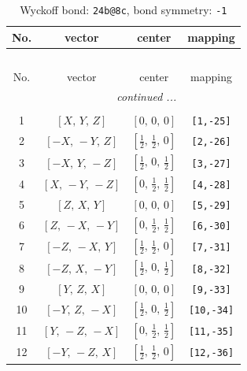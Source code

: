 \documentclass[fleqn,8pt]{jsarticle}
\begin{document}
\begin{longtable}{cccc}
\caption{Wyckoff bond: {\tt 24b@8c}, bond symmetry: {\tt -1}}
 \\
 \hline \hline
No. & vector & center & mapping \\ \hline \endfirsthead

\multicolumn{3}{l}{\tablename\ \thetable{}} \\
 \hline \hline
No. & vector & center & mapping \\ \hline \endhead

 \hline \hline
\multicolumn{3}{r}{\footnotesize\it continued ...} \\ \endfoot

 \hline \hline
\multicolumn{3}{r}{} \\ \endlastfoot

1 & $\left[ X,\, Y,\, Z \right]$ & $\left[ 0,\, 0,\, 0 \right]$ & {\tt [1,-25]} \\ \hline
2 & $\left[ - X,\, - Y,\, Z \right]$ & $\left[ \frac{1}{2},\, \frac{1}{2},\, 0 \right]$ & {\tt [2,-26]} \\ \hline
3 & $\left[ - X,\, Y,\, - Z \right]$ & $\left[ \frac{1}{2},\, 0,\, \frac{1}{2} \right]$ & {\tt [3,-27]} \\ \hline
4 & $\left[ X,\, - Y,\, - Z \right]$ & $\left[ 0,\, \frac{1}{2},\, \frac{1}{2} \right]$ & {\tt [4,-28]} \\ \hline
5 & $\left[ Z,\, X,\, Y \right]$ & $\left[ 0,\, 0,\, 0 \right]$ & {\tt [5,-29]} \\ \hline
6 & $\left[ Z,\, - X,\, - Y \right]$ & $\left[ 0,\, \frac{1}{2},\, \frac{1}{2} \right]$ & {\tt [6,-30]} \\ \hline
7 & $\left[ - Z,\, - X,\, Y \right]$ & $\left[ \frac{1}{2},\, \frac{1}{2},\, 0 \right]$ & {\tt [7,-31]} \\ \hline
8 & $\left[ - Z,\, X,\, - Y \right]$ & $\left[ \frac{1}{2},\, 0,\, \frac{1}{2} \right]$ & {\tt [8,-32]} \\ \hline
9 & $\left[ Y,\, Z,\, X \right]$ & $\left[ 0,\, 0,\, 0 \right]$ & {\tt [9,-33]} \\ \hline
10 & $\left[ - Y,\, Z,\, - X \right]$ & $\left[ \frac{1}{2},\, 0,\, \frac{1}{2} \right]$ & {\tt [10,-34]} \\ \hline
11 & $\left[ Y,\, - Z,\, - X \right]$ & $\left[ 0,\, \frac{1}{2},\, \frac{1}{2} \right]$ & {\tt [11,-35]} \\ \hline
12 & $\left[ - Y,\, - Z,\, X \right]$ & $\left[ \frac{1}{2},\, \frac{1}{2},\, 0 \right]$ & {\tt [12,-36]} \\ \hline

\end{longtable}
\end{document}
